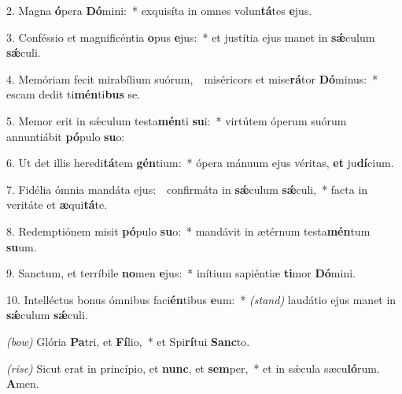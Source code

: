 2. Magna \textbf{ó}pera \textbf{Dó}mini:~* exquisíta in omnes volun\textbf{tá}tes \textbf{e}jus.

3. Conféssio et magnificéntia \textbf{o}pus \textbf{e}jus:~* et justítia ejus manet in \textbf{s\'{\ae}}culum \textbf{s\'{\ae}}culi.

4. Memóriam fecit mirabílium suórum,~\GreDagger\ miséricors et mise\textbf{rá}tor \textbf{Dó}minus:~* escam dedit ti\textbf{mén}ti\textbf{bus} se.

5. Memor erit in s\'{\ae}culum testa\textbf{mén}ti \textbf{su}i:~* virtútem óperum suórum annuntiábit \textbf{pó}pulo \textbf{su}o:

6. Ut det illis heredi\textbf{tá}tem \textbf{gén}tium:~* ópera mánuum ejus véritas, \textbf{et} ju\textbf{dí}cium.

7. Fidélia ómnia mandáta ejus:~\GreDagger\ confirmáta in \textbf{s\'{\ae}}culum \textbf{s\'{\ae}}culi,~* facta in veritáte et \textbf{æ}qui\textbf{tá}te.

8. Redemptiónem misit \textbf{pó}pulo \textbf{su}o:~* mandávit in ætérnum testa\textbf{mén}tum \textbf{su}um.

9. Sanctum, et terríbile \textbf{no}men \textbf{e}jus:~* inítium sapiéntiæ \textbf{ti}mor \textbf{Dó}mini.

10. Intelléctus bonus ómnibus faci\textbf{én}tibus \textbf{e}um:~* {\color{red}\textit{(stand)}} laudátio ejus manet in \textbf{s\'{\ae}}culum \textbf{s\'{\ae}}culi.

{\color{red}\textit{(bow)}} Glória \textbf{Pa}tri, et \textbf{Fí}lio,~* et Spi\textbf{rí}tui \textbf{Sanc}to.

{\color{red}\textit{(rise)}} Sicut erat in princípio, et \textbf{nunc}, et \textbf{sem}per,~* et in s\'{\ae}cula sæcu\textbf{ló}rum. \textbf{A}men.